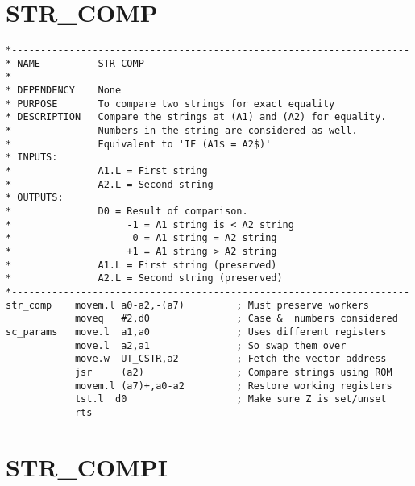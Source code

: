 \section{STR\_COMP}
\label{ch9-STR_COMP}%

\begin{lstlisting}[firstnumber=1,caption={STR\_COMP}]
*---------------------------------------------------------------------
* NAME          STR_COMP
*---------------------------------------------------------------------
* DEPENDENCY    None
* PURPOSE       To compare two strings for exact equality
* DESCRIPTION   Compare the strings at (A1) and (A2) for equality.
*               Numbers in the string are considered as well.
*               Equivalent to 'IF (A1$ = A2$)'
* INPUTS:
*               A1.L = First string
*               A2.L = Second string
* OUTPUTS:
*               D0 = Result of comparison.
*                    -1 = A1 string is < A2 string
*                     0 = A1 string = A2 string
*                    +1 = A1 string > A2 string
*               A1.L = First string (preserved)
*               A2.L = Second string (preserved)
*---------------------------------------------------------------------
str_comp    movem.l a0-a2,-(a7)         ; Must preserve workers
            moveq   #2,d0               ; Case &  numbers considered
sc_params   move.l  a1,a0               ; Uses different registers
            move.l  a2,a1               ; So swap them over
            move.w  UT_CSTR,a2          ; Fetch the vector address
            jsr     (a2)                ; Compare strings using ROM
            movem.l (a7)+,a0-a2         ; Restore working registers
            tst.l  d0                   ; Make sure Z is set/unset
            rts
\end{lstlisting}

\section{STR\_COMPI}
\label{ch9-STR_COMPI}%

